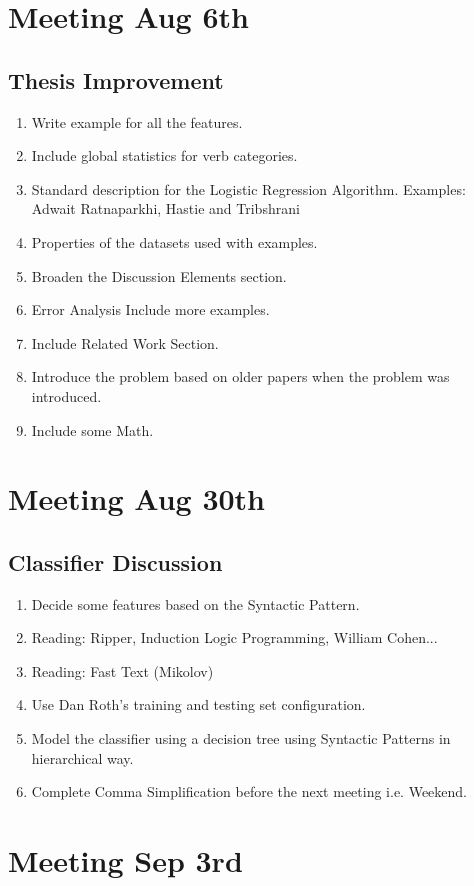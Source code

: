 \documentclass[11pt]{article}
\begin{document}
\section{Meeting Aug 6th}
\subsection{Thesis Improvement}
\begin{enumerate}
\item  Write example for all the features.
\item Include global statistics  for verb categories.
\item Standard description for the Logistic Regression Algorithm. Examples: Adwait Ratnaparkhi, Hastie and Tribshrani
\item Properties of the datasets used with examples.
\item Broaden the Discussion Elements section.
\item Error Analysis Include more examples.
\item Include Related Work Section.
\item Introduce the problem based on older papers when the problem was introduced.
\item Include some Math.
\end{enumerate}

\section{Meeting Aug 30th}
\subsection{Classifier Discussion}
\begin{enumerate}
\item  Decide some features based on the Syntactic Pattern.
\item Reading: Ripper, Induction Logic Programming, William Cohen...
\item Reading: Fast Text (Mikolov)
\item Use Dan Roth's training and testing set configuration.
\item Model the classifier using a decision tree using Syntactic Patterns in hierarchical way.
\item Complete Comma Simplification before the next meeting i.e. Weekend.
\end{enumerate}

\section{Meeting Sep 3rd}
\end{document}
